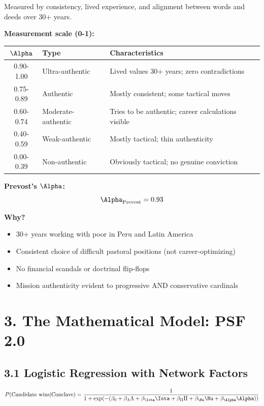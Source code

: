 \documentclass[11pt]{article}
\begin{document}
Measured by consistency, lived experience, and alignment between words and deeds over 30+ years.

\textbf{Measurement scale (0-1):}

\begin{table}[h]
\centering
\begin{tabular}{|c|l|l|}
\hline
$\Alpha$ & \textbf{Type} & \textbf{Characteristics} \\
\hline
0.90-1.00 & Ultra-authentic & Lived values 30+ years; zero contradictions \\
0.75-0.89 & Authentic & Mostly consistent; some tactical moves \\
0.60-0.74 & Moderate-authentic & Tries to be authentic; career calculations visible \\
0.40-0.59 & Weak-authentic & Mostly tactical; thin authenticity \\
0.00-0.39 & Non-authentic & Obviously tactical; no genuine conviction \\
\hline
\end{tabular}
\end{table}

\textbf{Prevost's $\Alpha$:}
$$\Alpha_{\text{Prevost}} = 0.93$$

\textbf{Why?}
\begin{itemize}
\item 30+ years working with poor in Peru and Latin America
\item Consistent choice of difficult pastoral positions (not career-optimizing)
\item No financial scandals or doctrinal flip-flops
\item Mission authenticity evident to progressive AND conservative cardinals
\end{itemize}

\section{3. The Mathematical Model: PSF 2.0}

\subsection{3.1 Logistic Regression with Network Factors}

\begin{equation}
P(\text{Candidate wins} | \text{Conclave}) = \frac{1}{1 + \exp(-(\beta_0 + \beta_\Lambda \Lambda + \beta_\Iota \Iota + \beta_\Pi \Pi + \beta_\Nu \Nu + \beta_\Alpha \Alpha))}
\end{equation}
\end{document}
